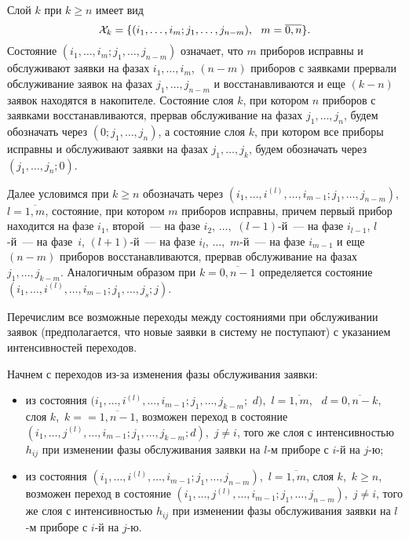 \begin{multicols}{2}
Слой $k$ при $k \ge n$ имеет вид
\begin{equation*}
{\cal X}_k
=
\{(i_1,\ldots,i_m;j_1,\ldots,j_{n-m}),\ \ m=\overline{0,n}\}.
\end{equation*}
Состояние $(i_1,\ldots,i_m; j_1,\ldots,j_{n-m})$ означает, что $m$
приборов исправны и обслуживают заявки на фазах $i_1,\ldots,i_m$,
$(n-m)$ приборов с заявками прервали обслуживание заявок на фазах
$j_1,\ldots,j_{n-m}$ и восстанавливаются и еще $(k-n)$ заявок
находятся в накопителе.
Состояние слоя $k$, при котором $n$ приборов с заявками
восстанавливаются, прервав обслуживание на фазах $j_1,\ldots,j_{n}$,
будем обозначать через $(0;j_1,\ldots,j_{n})$,
а состояние слоя $k$, при котором все приборы исправны и обслуживают
заявки на фазах $j_1,\ldots,j_{k}$, будем обозначать через
$(j_1,\ldots,j_n;0)$.

Далее условимся при $k \ge n$ обозначать через
$(i_1,\ldots,i^{(l)},\ldots,i_{m-1};j_1,\ldots,j_{n-m})$,
$l=\overline{1,m}$,
состояние, при котором $m$ приборов исправны, причем первый прибор
находится на фазе $i_1$, второй~--- на фазе $i_2$,
$\ldots,$
$(l-1)$-й~--- на фазе $i_{l-1}$,
$l$-й~--- на фазе~$i$,
$(l+1)$-й~--- на фазе $i_{l}$,
$\ldots,$
$m$-й~--- на фазе $i_{m-1}$
и еще $(n-m)$ приборов восстанавливаются, прервав обслуживание на
фазах $j_1,\ldots,j_{k-m}$.
Аналогичным образом при $k=\overline{0,n-1}$ определяется состояние
$(i_1,\ldots,i^{(l)},\ldots,i_{m-1};j_1,\ldots,j_{s};j)$.

Перечислим все возможные переходы между состояниями при обслуживании
заявок (предполагается, что новые заявки в систему не поступают)
с указанием интенсивностей переходов.

Начнем с переходов из-за изменения фазы обслуживания заявки:
\begin{itemize}
\item
из состояния
$(i_1,\ldots,i^{(l)},\ldots,i_{m-1};j_1,\ldots,j_{k-m};$ $d)$,\
$l=\overline{1,m}$, \ $d=\overline{0,n-k}$,
слоя $k$,\ $k=$\linebreak $=\overline{1,n-1}$, возможен переход в состояние
$(i_1,\ldots,j^{(l)},\ldots,i_{m-1};j_1,\ldots,j_{k-m};d)$,\
$j\ne i$,
того же слоя с интенсивностью $h_{ij}$ при изменении фазы
обслуживания заявки на $l$-м приборе с $i$-й на $j$-ю;
\item
из состояния
$(i_1,\ldots,i^{(l)}\!,\ldots,i_{m-1};j_1,\ldots,j_{n-m})$,\
$l=\overline{1,m}$,
слоя $k$,\ $k\ge n$, возможен переход в состояние
$(i_1,\ldots,j^{(l)},\ldots,i_{m-1};j_1,\ldots,j_{n-m})$,\
$j\ne i$,
того же слоя с интенсивностью $h_{ij}$ при изменении фазы
обслуживания заявки на $l$-м приборе с $i$-й на $j$-ю.
\end{itemize}


\end{multicols}
